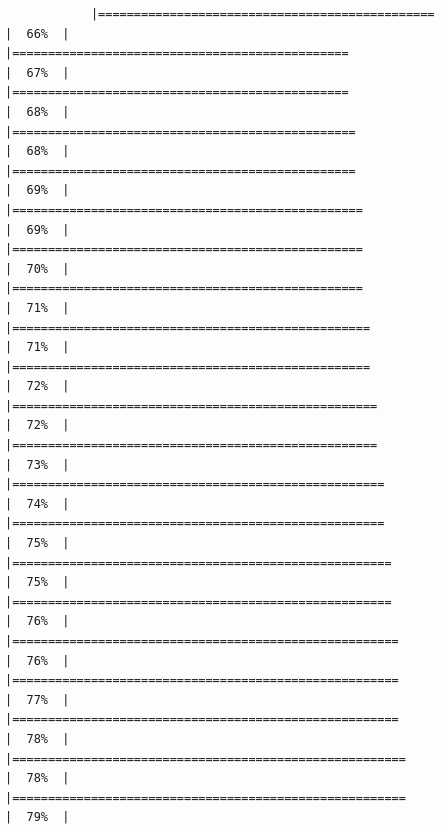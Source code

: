 \documentclass[
]{article}
\begin{document}
\begin{verbatim}
            |===============================================                       |  66%  |                                                                              |===============================================                       |  67%  |                                                                              |===============================================                       |  68%  |                                                                              |================================================                      |  68%  |                                                                              |================================================                      |  69%  |                                                                              |=================================================                     |  69%  |                                                                              |=================================================                     |  70%  |                                                                              |=================================================                     |  71%  |                                                                              |==================================================                    |  71%  |                                                                              |==================================================                    |  72%  |                                                                              |===================================================                   |  72%  |                                                                              |===================================================                   |  73%  |                                                                              |====================================================                  |  74%  |                                                                              |====================================================                  |  75%  |                                                                              |=====================================================                 |  75%  |                                                                              |=====================================================                 |  76%  |                                                                              |======================================================                |  76%  |                                                                              |======================================================                |  77%  |                                                                              |======================================================                |  78%  |                                                                              |=======================================================               |  78%  |                                                                              |=======================================================               |  79%  |                                                                   
\end{verbatim}
\end{document}

